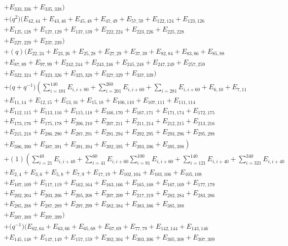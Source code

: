 \documentclass[pdftex]{sigma}
\numberwithin{equation}{section}
\theoremstyle{definition}
\begin{document}
\begin{align*}
&+E_{333,336}+E_{335,338})\\
&+\bigl(q^2\bigr)(E_{42,44}+E_{43,46}+E_{45,48}+E_{47,49}+E_{57,59}+E_{122,124}+E_{123,126}\\
&+E_{125,128}+E_{127,129}+E_{137,139}+E_{222,224}+E_{223,226}+E_{225,228}\\
&+E_{227,229}+E_{237,239})\\
&+(q)(E_{22,24}+E_{23,26}+E_{25,28}+E_{27,29}+E_{37,39}+E_{82,84}+E_{83,86}+E_{85,88}\\
&+E_{87,89}+E_{97,99}+E_{242,244}+E_{243,246}+E_{245,248}+E_{247,249}+E_{257,259}\\
&+E_{322,324}+E_{323,326}+E_{325,328}+E_{327,329}+E_{337,339})
\\
&+\bigl(q + q^{-1}\bigr)\left(\sum_{i=101}^{140} E_{i, i+80} +\sum_{i=201}^{260} E_{i,i+60} + \sum_{i=281} E_{i,i+60} + E_{6,10}+E_{7,11}\right. \\
&+E_{11,14}
+E_{12,15}+E_{13,16}+E_{15,18}+E_{106,110}+E_{107,111}+E_{111,114}\\
&+E_{112,115}+E_{113,116}+E_{115,118}+E_{166,170}+E_{167,171}+E_{171,174}+E_{172,175}\\
&+E_{173,176}+E_{175,178}+E_{206,210}+E_{207,211}+E_{211,214}+E_{212,215}+E_{213,216}\\
&+E_{215,218}+E_{286,290}+E_{287,291}+E_{291,294}+E_{292,295}+E_{293,296}+E_{295,298}\\
&\left.+E_{386,390}+E_{387,391}+E_{391,394}+E_{392,395}+E_{393,396}+E_{395,398}\right)
\\
&+(1)\left(\sum_{i=21}^{40}E_{i,i+40} +\sum_{i=41}^{60}E_{i,i+60} \sum_{i=81}^{100}E_{i,i+60} + \sum_{i=121}^{140}E_{i,i+40} +\sum_{i=321}^{340} E_{i,i+40} \right. \\
&+E_{2,4}+E_{3,6}+E_{5,8}+E_{7,9}+E_{17,19}+E_{102,104}+E_{103,106}+E_{105,108}\\
&+E_{107,109}+E_{117,119}+E_{162,164}+E_{163,166}+E_{165,168}+E_{167,169}+E_{177,179}\\
&+E_{202,204}+E_{203,206}+E_{205,208}+E_{207,209}+E_{217,219}+E_{282,284}+E_{283,286}\\
&+E_{285,288}+E_{287,289}+E_{297,299}+E_{382,384}+E_{383,386} +E_{385,388}\\
&+E_{387,389}+E_{397,399})
\\
&+\bigl(q^{-1}\bigr)(E_{62,64}+E_{63,66}+E_{65,68}+E_{67,69}+E_{77,79}+E_{142,144}+E_{143,146}\\
&+E_{145,148}+E_{147,149}+E_{157,159}+E_{302,304}+E_{303,306}+E_{305,308}+E_{307,309}\\

\end{align*}
\end{document}
